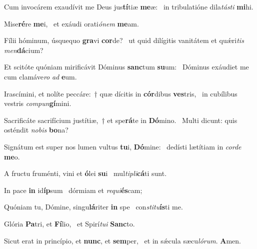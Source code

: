 \item Cum invocárem exaudívit me Deus jus\textbf{tí}tiæ \textbf{me}æ:~\psstar{} in tribulatióne dila\textit{tásti} \textbf{mi}hi.
\item Mise\textbf{ré}re \textbf{me}i,~\psstar{} et exáudi orati\textit{ónem} \textbf{me}am.
\item Fílii hóminum, úsquequo \textbf{gra}vi \textbf{cor}de?~\psstar{} ut quid dilígitis vanitátem et quǽri\textit{tis} \textit{men}\textbf{dá}cium?
\item Et scitóte quóniam mirificávit Dóminus \textbf{sanc}tum \textbf{su}um:~\psstar{} Dóminus exáudiet me cum clamáve\textit{ro} \textit{ad} \textbf{e}um.
\item Irascímini, et nolíte peccáre:~† quæ dícitis in \textbf{cór}dibus \textbf{ves}tris,~\psstar{} in cubílibus vestris \textit{compun}\textbf{gí}mini.
\item Sacrificáte sacrifícium justítiæ,~† et spe\textbf{rá}te in \textbf{Dó}mino.~\psstar{} Multi dicunt: quis osténdit \textit{nobis} \textbf{bo}na?
\item Signátum est super nos lumen vultus \textbf{tu}i, \textbf{Dó}mine:~\psstar{} dedísti lætítiam in \textit{corde} \textbf{me}o.
\item A fructu fruménti, vini et \textbf{ó}lei \textbf{su}i~\psstar{} mul\textit{tipli}\textbf{cá}ti sunt.
\item In pace \textbf{in} id\textbf{íp}sum~\psstar{} dórmiam et \textit{requi}\textbf{és}cam;
\item Quóniam tu, Dómine, singu\textbf{lá}riter \textbf{in} spe~\psstar{} con\textit{stitu}\textbf{ís}ti me.
\item Glória \textbf{Pa}tri, et \textbf{Fí}lio,~\psstar{} et Spirí\textit{tui} \textbf{Sanc}to.
\item Sicut erat in princípio, et \textbf{nunc}, et \textbf{sem}per,~\psstar{} et in sǽcula sæcu\textit{lórum}. \textbf{A}men.
